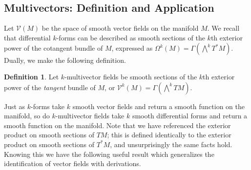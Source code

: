 \documentclass[psamsfonts,12pt]{amsart}
\newcommand\0{\mathbf{0}}
\theoremstyle{plain}
\theoremstyle{definition}
\newtheorem{dfn}[thm]{Definition} %
\newcommand{\sV}{\mathcal{V}}
\begin{document}
\subsection{Multivectors: Definition and Application}

Let $\sV(M)$ be the space of smooth vector fields on the manifold $M$.  We recall that differential $k$-forms can be described as smooth sections of the $k$th exterior power of the cotangent bundle of $M$, expressed as $\Omega^k(M)=\Gamma\left(\bigwedge^k T^* M\right)$.  Dually, we make the following definition.
\begin{dfn}
Let $k$-multivector fields be smooth sections of the $k$th exterior power of the \textit{tangent} bundle of $M$, or $\sV^k(M)=\Gamma\left(\bigwedge^k TM\right)$.
\end{dfn}
Just as $k$-forms take $k$ smooth vector fields and return a smooth function on the manifold, so do $k$-multivector fields take $k$ smooth differential forms and return a smooth function on the manifold.  Note that we have referenced the exterior product on smooth sections of $TM$; this is defined identically to the exterior product on smooth sections of $T^*M$, and unsurprisingly the same facts hold.   Knowing this we have the following useful result which generalizes the identification of vector fields with derivations.
\end{document}
